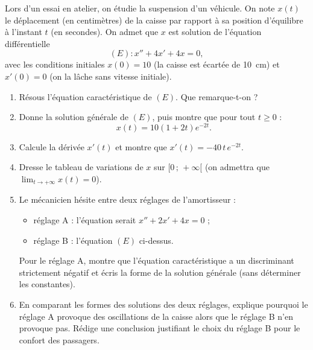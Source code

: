 \documentclass[11pt]{article}
\begin{document}
\begin{exercice}
Lors d'un essai en atelier, on étudie la suspension d'un véhicule. On note $x(t)$ le déplacement (en centimètres) de la caisse par rapport à sa position d'équilibre à l'instant $t$ (en secondes). On admet que $x$ est solution de l'équation différentielle
\[ (E) : x'' + 4x' + 4x = 0, \]
avec les conditions initiales $x(0) = 10$ (la caisse est écartée de \SI{10}{cm}) et $x'(0) = 0$ (on la lâche sans vitesse initiale).
\begin{enumerate}
\item Résous l'équation caractéristique de $(E)$. Que remarque-t-on ?
\item Donne la solution générale de $(E)$, puis montre que pour tout $t \geq 0$ :
\[ x(t) = 10(1 + 2t)e^{-2t}. \]
\item Calcule la dérivée $x'(t)$ et montre que $x'(t) = -40\,t\,e^{-2t}$.
\item Dresse le tableau de variations de $x$ sur $[0\,;\,+\infty[$ (on admettra que $\displaystyle\lim_{t \to +\infty} x(t) = 0$).
\item Le mécanicien hésite entre deux réglages de l'amortisseur :
\begin{itemize}
\item réglage A : l'équation serait $x'' + 2x' + 4x = 0$ ;
\item réglage B : l'équation $(E)$ ci-dessus.
\end{itemize}
Pour le réglage A, montre que l'équation caractéristique a un discriminant strictement négatif et écris la forme de la solution générale (sans déterminer les constantes).
\item En comparant les formes des solutions des deux réglages, explique pourquoi le réglage A provoque des oscillations de la caisse alors que le réglage B n'en provoque pas. Rédige une conclusion justifiant le choix du réglage B pour le confort des passagers.
\end{enumerate}
\end{exercice}
\end{document}
